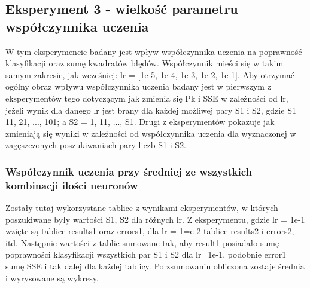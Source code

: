 \documentclass[a4paper, 12pt]{article}
\begin{document}
\clearpage

\newpage
\subsection{Eksperyment 3 - wielkość parametru współczynnika uczenia}
W tym eksperymencie badany jest wpływ współczynnika uczenia na poprawność klasyfikacji oraz sumę kwadratów błędów. Współczynnik mieści się w takim samym zakresie, jak wcześniej: lr = [1e-5, 1e-4, 1e-3, 1e-2, 1e-1]. Aby otrzymać ogólny obraz wpływu współczynnika uczenia badany jest w pierwszym z eksperymentów tego dotyczącym jak zmienia się Pk i SSE w zależności od lr, jeżeli wynik dla danego lr jest brany dla każdej możliwej pary S1 i S2, gdzie S1 = 11, 21, ..., 101; a S2 = 1, 11, ..., S1. Drugi z eksperymentów pokazuje jak zmieniają się wyniki w zależności od współczynnika uczenia dla wyznaczonej w zagęszczonych poszukiwaniach pary liczb S1 i S2.\\

\subsubsection{Współczynnik uczenia przy średniej ze wszystkich kombinacji ilości neuronów}
Zostały tutaj wykorzystane tablice z wynikami eksperymentów, w których poszukiwane były wartości S1, S2 dla różnych lr. Z eksperymentu, gdzie lr = 1e-1 wzięte są tablice results1 oraz errors1, dla lr = 1=e-2 tablice results2 i errors2, itd. Następnie wartości z tablic sumowane tak, aby result1 posiadało sumę poprawności klasyfikacji wszystkich par S1 i S2 dla lr=1e-1, podobnie error1 sumę SSE i tak dalej dla każdej tablicy. Po zsumowaniu obliczona zostaje średnia i wyrysowane są wykresy.

\clearpage
\end{document}
